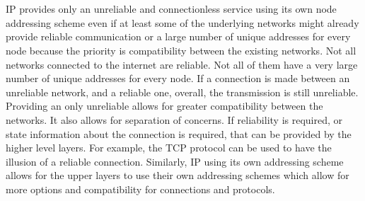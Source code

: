 \section{}
IP provides only an unreliable and connectionless service using its own node
addressing scheme even if at least some of the underlying networks might already
provide reliable communication or a large number of unique addresses for every
node because the priority is compatibility between the existing networks. Not
all networks connected to the internet are reliable. Not all of them have a very
large number of unique addresses for every node. If a connection is made between
an unreliable network, and a reliable one, overall, the transmission is still
unreliable. Providing an only unreliable allows for greater compatibility
between the networks. It also allows for separation of concerns. If reliability
is required, or state information about the connection is required, that can be
provided by the higher level layers. For example, the TCP protocol can be used
to have the illusion of a reliable connection. Similarly, IP using its own
addressing scheme allows for the upper layers to use their own addressing
schemes which allow for more options and compatibility for connections and
protocols. 

